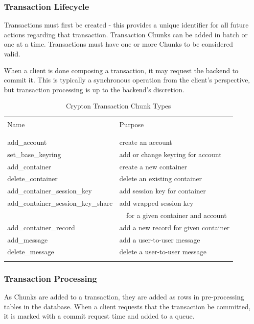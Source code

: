 \documentclass[conference]{IEEEtran}
\begin{document}
\subsubsection{Transaction Lifecycle}
Transactions must first be created - this provides a unique identifier for
all future actions regarding that transaction. Transaction Chunks can be added
in batch or one at a time. Transactions must have one or more Chunks to be
considered valid.

When a client is done composing a transaction, it may request the backend
to commit it. This is typically a synchronous operation from the client's
perspective, but transaction processing is up to the backend's discretion.

\begin{table}[ht]
\caption{Crypton Transaction Chunk Types}
\centering
\begin{tabular}{l l}
\hline\hline
\\ [0.1ex]
Name & Purpose \\
\\ [0.1ex]
\hline
\\ [0.3ex]
add\_account & create an account \\
set\_base\_keyring & add or change keyring for account \\
add\_container & create a new container \\
delete\_container & delete an existing container \\
add\_container\_session\_key & add session key for container \\
add\_container\_session\_key\_share & add wrapped session key \\ & \ \ for a given container and account \\
add\_container\_record & add a new record for given container \\
add\_message & add a user-to-user message \\
delete\_message & delete a user-to-user message \\
\\ [0.3ex]
\hline
\end{tabular}
\label{table:nonlin}
\end{table}

\subsubsection{Transaction Processing}
As Chunks are added to a transaction, they are added as rows in
pre-processing tables in the database. When a client requests that the
transaction be committed, it is marked with a commit request time and added
to a queue.
\end{document}
